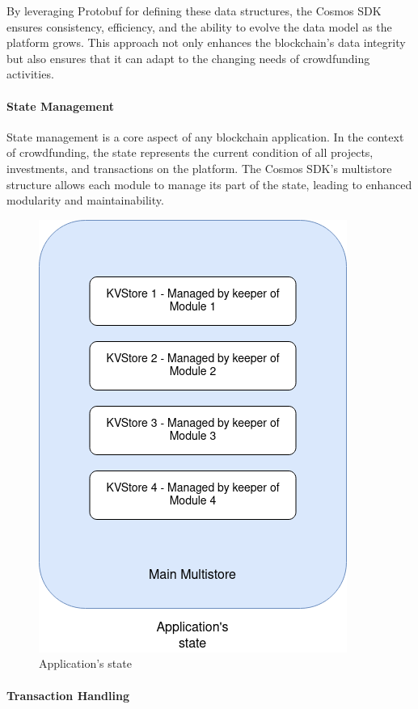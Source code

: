 By leveraging Protobuf for defining these data structures, the Cosmos SDK ensures consistency, efficiency, and the ability to evolve the data model as the platform grows. This approach not only enhances the blockchain's data integrity but also ensures that it can adapt to the changing needs of crowdfunding activities.

\paragraph{State Management}
\label{par:state-management}

State management is a core aspect of any blockchain application. In the context of crowdfunding, the state represents the current condition of all projects, investments, and transactions on the platform. The Cosmos SDK's multistore structure allows each module to manage its part of the state, leading to enhanced modularity and maintainability.

\begin{figure}[H]
    \centering
    \includegraphics[scale=0.45]{figures/multistore.png}
    \caption{Application's state}
    \label{fig:application-multistore}
\end{figure}

\paragraph{Transaction Handling}
\label{par:transaction-handling}

